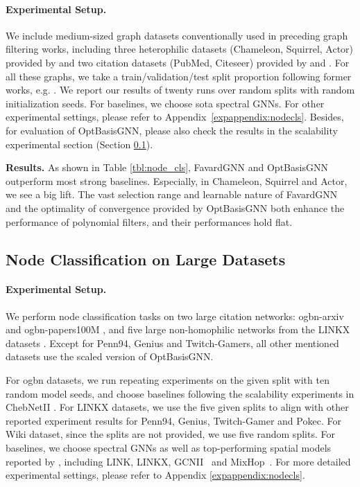 \paragraph*{Experimental Setup.} 
We include medium-sized graph datasets conventionally used in preceding 
graph filtering works, 
including  
three heterophilic datasets (Chameleon, Squirrel, Actor) 
provided by \citet{Pei2020GeomGCN}
and
two citation datasets (PubMed, Citeseer)
provided by \citet{yang2016revisiting} and \citet{sen2008collective}
. 
For all these graphs, we take a  train/validation/test 
split proportion following former works, e.g. \citet{chien2021gprgnn}. 
We report our results
of twenty runs over random splits with random initialization seeds. 
For baselines, we choose sota spectral GNNs.  
For other experimental settings, please refer to Appendix~\ref{expappendix:nodecls}.
Besides, for evaluation of OptBasisGNN, 
please also check the results in the scalability 
experimental section (Section \ref{sec:exp_scaleup}). 


\textbf{Results.\quad} 
As shown in Table \ref{tbl:node_cls}, 
FavardGNN and OptBasisGNN outperform most strong baselines. Especially, in Chameleon, Squirrel and Actor, we see a big lift.
The vast selection range and learnable nature of FavardGNN and the optimality of convergence provided by OptBasisGNN both enhance the performance of polynomial filters, and their performances hold flat. 

\subsection{Node Classification on Large Datasets}
\label{sec:exp_scaleup}
\paragraph*{Experimental Setup.}
We perform node classification tasks on 
two large citation networks: ogbn-arxiv and ogbn-papers100M \cite{ogb}, 
and five large non-homophilic networks from the LINKX datasets \cite{Lim2021large}
.
Except for Penn94, Genius and Twitch-Gamers, 
all other mentioned datasets use the scaled version of OptBasisGNN.

For ogbn datasets, 
we run repeating experiments on the given split with ten random model seeds, 
and choose baselines following the scalability experiments in ChebNetII \cite{he2022chebii}.
{For LINKX datasets}, 
we use the five given splits 
to align with other reported experiment results
for Penn94, Genius, Twitch-Gamer and Pokec.
For Wiki dataset, 
since the splits are not provided, 
we use five random splits. 
For baselines, we choose spectral GNNs 
as well as top-performing spatial  models reported by \citet{Lim2021large}, including LINK, LINKX, 
GCNII~\cite{chen2020gcnii} 
and MixHop~\cite{abu2019mixhop}.  
For more detailed experimental settings, please refer to Appendix \ref{expappendix:nodecls}.


